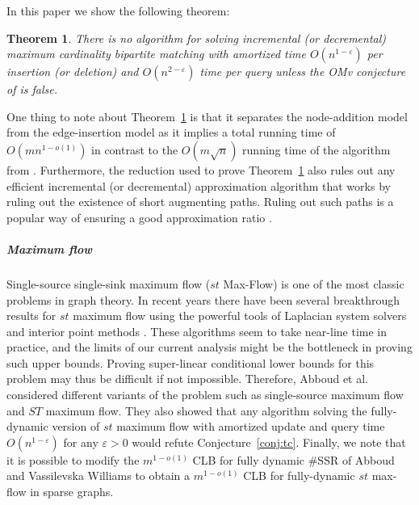 \documentclass[a4paper,11pt]{article}
\newcommand{\eps}{\varepsilon}
\newtheorem{theorem}{Theorem}
\theoremstyle{definition}
\begin{document}
In this paper we show the following theorem:
\begin{theorem}\label{thm:matching}
    There is no algorithm for solving incremental (or decremental) maximum
    cardinality
    bipartite matching with amortized time $O(n^{1-\eps})$ per insertion (or
    deletion) and $O(n^{2-\eps})$ time per query unless the OMv conjecture of
    \cite{HenzingerKNS15} is false.
\end{theorem}
One thing to note about Theorem~\ref{thm:matching} is that it separates the
node-addition model from the edge-insertion model as it implies a total running
time of $O(mn^{1-o(1)})$ in contrast to the $O(m\sqrt{n})$ running time of the algorithm from \cite{BosekLSZ14}. Furthermore, the reduction used to
prove Theorem~\ref{thm:matching} also rules out any efficient incremental (or
decremental) approximation algorithm that works by ruling out the existence of
short augmenting paths. Ruling out such paths is a popular way of ensuring a
good approximation ratio \cite{NeimanS13}.

\subparagraph*{Maximum flow}
Single-source single-sink maximum flow ($st$ Max-Flow) is one of the most
classic problems in graph theory.
In recent
years there have been several breakthrough results for $st$ maximum flow using
the powerful tools of Laplacian system solvers and interior point methods
\cite{Madry13,Sherman13,KelnerLOS14,LeeS14}. These algorithms seem to take
near-line time in practice, and the limits of our current analysis might be the
bottleneck in proving such upper bounds. Proving super-linear conditional
lower bounds for this problem may
thus be difficult if not impossible. Therefore, Abboud et al.~\cite{AbboudVY15}
considered different variants of the problem such as single-source maximum flow
and $ST$ maximum flow. They also showed that any algorithm solving the
fully-dynamic version of $st$ maximum flow with amortized update and query time
$O(n^{1-\eps})$ for any $\eps>0$ would refute Conjecture~\ref{conj:tc}.
Finally, we note that it is possible to modify the $m^{1-o(1)}$ CLB for fully
dynamic \#SSR of Abboud and Vassilevska Williams \cite{AbboudV14} to obtain a
$m^{1-o(1)}$ CLB for fully-dynamic $st$ max-flow in sparse graphs.
\end{document}
